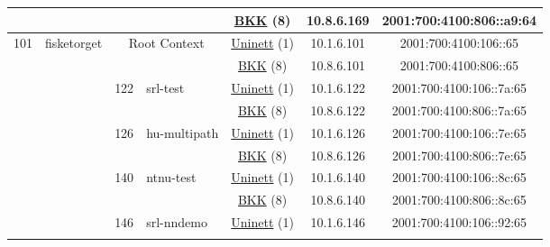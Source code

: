 \begin{small}
\begin{center}
\begin{longtable}{|c|c|c|c|c|c|c|c|}
  &  &  &  & \multicolumn{2}{|c|}{\tiny{\href{http://bkk.no}{BKK} (8)}} & \tiny{10.8.6.169} & \tiny{2001:700:4100:806::a9:64} \\ \hline
 \multirow{14}{*}{\tiny{101}} & \multicolumn{1}{|l|}{\multirow{14}{*}{\tiny{fisketorget}}} & \multicolumn{2}{|c|}{\multirow{2}{*}{\tiny{Root Context}}} & \multicolumn{2}{|c|}{\tiny{\href{https://www.uninett.no}{Uninett} (1)}} & \tiny{10.1.6.101} & \tiny{2001:700:4100:106::65} \\* \cline{5-5}\cline{6-6}\cline{7-7}\cline{8-8}
  &  & \multicolumn{2}{|c|}{} & \multicolumn{2}{|c|}{\tiny{\href{http://bkk.no}{BKK} (8)}} & \tiny{10.8.6.101} & \tiny{2001:700:4100:806::65} \\* \cline{3-3}\cline{4-4}\cline{5-5}\cline{6-6}\cline{7-7}\cline{8-8}
  &  & \multirow{2}{*}{\tiny{122}} & \multicolumn{1}{|l|}{\multirow{2}{*}{\tiny{srl-test}}} & \multicolumn{2}{|c|}{\tiny{\href{https://www.uninett.no}{Uninett} (1)}} & \tiny{10.1.6.122} & \tiny{2001:700:4100:106::7a:65} \\* \cline{5-5}\cline{6-6}\cline{7-7}\cline{8-8}
  &  &  &  & \multicolumn{2}{|c|}{\tiny{\href{http://bkk.no}{BKK} (8)}} & \tiny{10.8.6.122} & \tiny{2001:700:4100:806::7a:65} \\* \cline{3-3}\cline{4-4}\cline{5-5}\cline{6-6}\cline{7-7}\cline{8-8}
  &  & \multirow{2}{*}{\tiny{126}} & \multicolumn{1}{|l|}{\multirow{2}{*}{\tiny{hu-multipath}}} & \multicolumn{2}{|c|}{\tiny{\href{https://www.uninett.no}{Uninett} (1)}} & \tiny{10.1.6.126} & \tiny{2001:700:4100:106::7e:65} \\* \cline{5-5}\cline{6-6}\cline{7-7}\cline{8-8}
  &  &  &  & \multicolumn{2}{|c|}{\tiny{\href{http://bkk.no}{BKK} (8)}} & \tiny{10.8.6.126} & \tiny{2001:700:4100:806::7e:65} \\* \cline{3-3}\cline{4-4}\cline{5-5}\cline{6-6}\cline{7-7}\cline{8-8}
  &  & \multirow{2}{*}{\tiny{140}} & \multicolumn{1}{|l|}{\multirow{2}{*}{\tiny{ntnu-test}}} & \multicolumn{2}{|c|}{\tiny{\href{https://www.uninett.no}{Uninett} (1)}} & \tiny{10.1.6.140} & \tiny{2001:700:4100:106::8c:65} \\* \cline{5-5}\cline{6-6}\cline{7-7}\cline{8-8}
  &  &  &  & \multicolumn{2}{|c|}{\tiny{\href{http://bkk.no}{BKK} (8)}} & \tiny{10.8.6.140} & \tiny{2001:700:4100:806::8c:65} \\* \cline{3-3}\cline{4-4}\cline{5-5}\cline{6-6}\cline{7-7}\cline{8-8}
  &  & \multirow{2}{*}{\tiny{146}} & \multicolumn{1}{|l|}{\multirow{2}{*}{\tiny{srl-nndemo}}} & \multicolumn{2}{|c|}{\tiny{\href{https://www.uninett.no}{Uninett} (1)}} & \tiny{10.1.6.146} & \tiny{2001:700:4100:106::92:65} \\* \cline{5-5}\cline{6-6}\cline{7-7}\cline{8-8}

\end{longtable}
\end{center}
\end{small}

